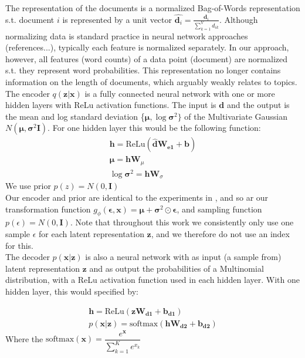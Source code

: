 \documentclass{report}
\begin{document}
The representation of the documents is a normalized Bag-of-Words representation s.t. document $i$ is represented by a unit vector $\hat{\mathbf{d}_i} = \frac{\mathbf{d}_i}{\sum_{k=1}^{V}d_{ik}}$. Although normalizing data is standard practice in neural network approaches (references...), typically each feature is normalized separately. In our approach, however, all features (word counts) of a data point (document) are normalized s.t. they represent word probabilities. This representation no longer contains information on the length of documents, which arguably weakly relates to topics.
\\
The encoder $q(\mathbf{z}|\mathbf{x})$ is a fully connected neural network with one or more hidden layers with ReLu activation functions. The input is $\mathbf{d}$ and the output is the mean and log standard deviation \{$\boldsymbol{\mu}, \log \boldsymbol{\sigma} ^2\}$ of the Multivariate Gaussian $N(\boldsymbol{\mu}, \boldsymbol{\sigma} ^2\textbf{I})$. For one hidden layer this would be the following function:
\begin{align}
\mathbf{h} = \text{ReLu}(\mathbf{\hat{d}}\mathbf{W_{e1}} + \mathbf{b}) \\
\boldsymbol{\mu} = \mathbf{hW}_{\mu} \\
\log \boldsymbol{\sigma}^2 = \mathbf{hW}_{\sigma}
\end{align} 
We use prior $p(z) = N(0,\textbf{I})$
\\
Our encoder and prior are identical to the experiments in \cite{kingma2013auto}, and so ar our transformation function $g_\phi(\boldsymbol{\epsilon},\mathbf{x}) = \boldsymbol{\mu} + \boldsymbol{\sigma}^2\odot \boldsymbol{\epsilon}$, and sampling function $p(\epsilon) = N(0,\textbf{I})$. Note that throughout this work we consistently only use one sample $\epsilon$ for each latent representation $\mathbf{z}$, and we therefore do not use an index for this.\\
The decoder $p(\mathbf{x}|\mathbf{z})$ is also a neural network with as input (a sample from) latent representation $\mathbf{z}$ and as output the probabilities of a Multinomial distribution, with a ReLu activation function used in each hidden layer. With one hidden layer, this would specified by:

\begin{align}
\mathbf{h} = \text{ReLu}(\mathbf{zW_{d1}+b_{d1}})
\\
p(\mathbf{x}|\mathbf{z}) = \text{softmax} (\mathbf{hW_{d2}}+\mathbf{b_{d2}})
\end{align}
Where the $\text{softmax}(\mathbf{x}) = \dfrac{e^{\mathbf{x}}}{\sum_{k=1}^{K}e^{x_k}}$
\end{document}

